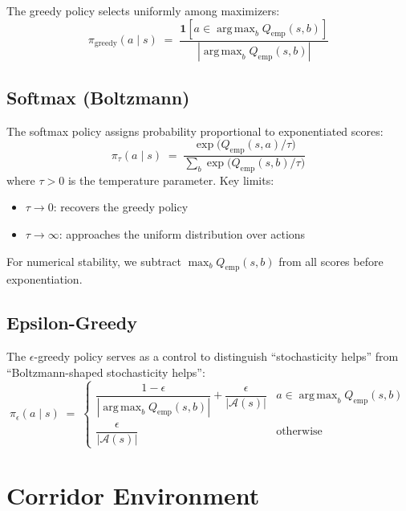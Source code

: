 \documentclass[11pt]{article}
\newcommand{\Qemp}{Q_{\mathrm{emp}}}
\newcommand{\argmax}{\operatorname{arg\,max}}
\begin{document}
The greedy policy selects uniformly among maximizers:
\begin{equation}
  \pi_{\mathrm{greedy}}(a \mid s) \;=\;
    \frac{\mathbf{1}[a \in \argmax_b \Qemp(s,b)]}{|\argmax_b \Qemp(s,b)|}
  \label{eq:greedy}
\end{equation}

\subsection{Softmax (Boltzmann)}

The softmax policy assigns probability proportional to exponentiated
scores:
\begin{equation}
  \pi_\tau(a \mid s) \;=\;
    \frac{\exp\!\big(\Qemp(s,a) / \tau\big)}
         {\sum_b \exp\!\big(\Qemp(s,b) / \tau\big)}
  \label{eq:softmax}
\end{equation}
where $\tau > 0$ is the temperature parameter.  Key limits:
\begin{itemize}
  \item $\tau \to 0$: recovers the greedy policy
  \item $\tau \to \infty$: approaches the uniform distribution over actions
\end{itemize}

For numerical stability, we subtract $\max_b \Qemp(s,b)$ from all
scores before exponentiation.

\subsection{Epsilon-Greedy}

The $\epsilon$-greedy policy serves as a control to distinguish
``stochasticity helps'' from ``Boltzmann-shaped stochasticity helps'':
\begin{equation}
  \pi_\epsilon(a \mid s) \;=\;
  \begin{cases}
    \dfrac{1 - \epsilon}{|\argmax_b \Qemp(s,b)|} + \dfrac{\epsilon}{|\mathcal{A}(s)|}
      & a \in \argmax_b \Qemp(s,b) \\[6pt]
    \dfrac{\epsilon}{|\mathcal{A}(s)|}
      & \text{otherwise}
  \end{cases}
  \label{eq:epsgreedy}
\end{equation}

\section{Corridor Environment}
\label{sec:corridor}
\end{document}
